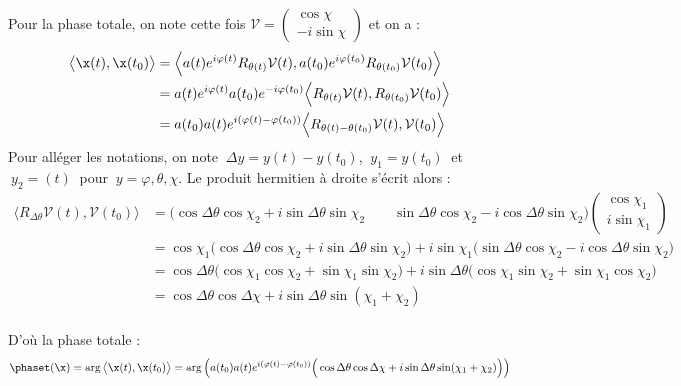 \begin{annexe}
\begin{demo}
	Pour la phase totale, on note cette fois $\mathcal{V} = \begin{pmatrix} \cos\chi \\ -i\sin\chi \end{pmatrix}$ et on a :
	\begin{align*}
		\big\langle \x(t), \x(t_0)\big\rangle &= \Big\langle a(t)e^{i\varphi(t)}R_{\theta(t)}\mathcal{V}(t), a(t_0)e^{i\varphi(t_0)}R_{\theta(t_0)}\mathcal{V}(t_0) \Big\rangle \\
		&= a(t)e^{i\varphi(t)} a(t_0)e^{-i\varphi(t_0)} \Big\langle R_{\theta(t)}\mathcal{V}(t), R_{\theta(t_0)}\mathcal{V}(t_0) \Big\rangle \\
		&= a(t_0)a(t)e^{i(\varphi(t)-\varphi(t_0))}\Big\langle R_{\theta(t)- \theta(t_0)}\mathcal{V}(t), \mathcal{V}(t_0) \Big\rangle
	\end{align*}
	Pour alléger les notations, on note $\ \Delta y =y(t)-y(t_0)$, $\ y_1=y(t_0)\ $ et $\ y_2=(t)\ $ pour $\ y=\varphi,\theta,\chi$. Le produit hermitien à droite s'écrit alors :
	\begin{align*}
		\Big\langle R_{\Delta\theta}\mathcal{V}(t), \mathcal{V}(t_0) \Big\rangle &=   \Big(\cos\Delta\theta \cos\chi_2 + i\sin\Delta\theta \sin\chi_2 \qquad \sin\Delta\theta \cos\chi_2 - i\cos\Delta\theta \sin\chi_2\Big) \begin{pmatrix} \cos\chi_1 \\ i\sin\chi_1 \end{pmatrix} \\
		&= \cos\chi_1\Big(\cos\Delta\theta \cos\chi_2 + i\sin\Delta\theta \sin\chi_2\Big) + i\sin\chi_1\Big(\sin\Delta\theta \cos\chi_2 - i\cos\Delta\theta \sin\chi_2\Big) \\
		&= \cos\Delta\theta \Big(\cos\chi_1 \cos\chi_2 + \sin\chi_1 \sin\chi_2\Big) + i\sin\Delta\theta \Big( \cos\chi_1 \sin\chi_2 + \sin\chi_1\cos\chi_2\Big) \\
		&= \cos\Delta\theta \cos\Delta\chi + i\sin\Delta\theta \sin(\chi_1+\chi_2)
	\end{align*}
	\\
	D'où la phase totale :
	\begin{align*}
		\phaset(\x) = \arg\big\langle \x(t), \x(t_0)\big\rangle &= \arg\left( a(t_0)a(t)e^{i(\varphi(t) - \varphi(t_0))}\Big( \cos\Delta\theta \cos\Delta\chi + i\sin\Delta\theta \sin(\chi_1+\chi_2) \Big) \right) \\

\end{align*}
\end{demo}
\end{annexe}
